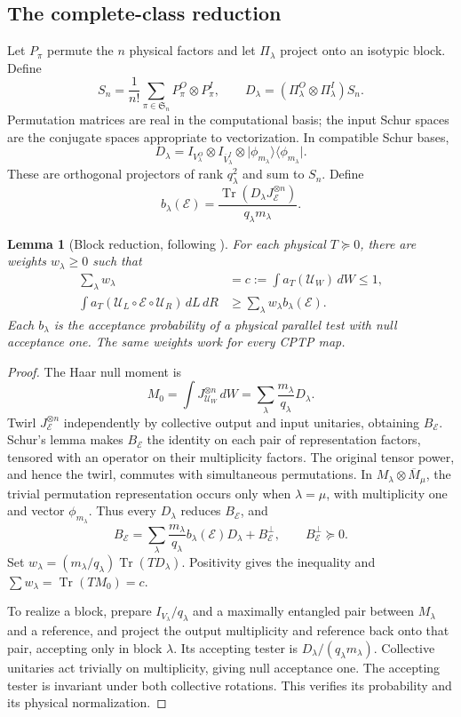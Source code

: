 \documentclass[11pt,a4paper]{article}
\newtheorem{lemma}[theorem]{Lemma}
\theoremstyle{remark}\newtheorem{remark}[theorem]{Remark}
\DeclareMathOperator{\Tr}{Tr}
\newcommand{\E}{\mathcal E}
\newcommand{\U}{\mathcal U}
\newcommand{\ket}[1]{\lvert #1\rangle}
\newcommand{\bra}[1]{\langle #1\rvert}
\begin{document}
\subsection{The complete-class reduction}
Let $P_\pi$ permute the $n$ physical factors and let $\Pi_\lambda$ project onto an isotypic block. Define
\[
S_n=\frac1{n!}\sum_{\pi\in\mathfrak S_n}P_\pi^O\otimes P_\pi^I,
\qquad D_\lambda=(\Pi_\lambda^O\otimes\Pi_\lambda^I)S_n.
\]
Permutation matrices are real in the computational basis; the input Schur spaces are the conjugate spaces appropriate to vectorization. In compatible Schur bases,
\[
D_\lambda=I_{V_\lambda^O}\otimes I_{\overline V_\lambda^I}
\otimes\ket{\phi_{m_\lambda}}\bra{\phi_{m_\lambda}}.
\]
These are orthogonal projectors of rank $q_\lambda^2$ and sum to $S_n$. Define
\[
b_\lambda(\E)=\frac{\Tr(D_\lambda J_\E^{\otimes n})}{q_\lambda m_\lambda}.
\]

\begin{lemma}[Block reduction, following \cite{complete}]\label{lem:block}
For each physical $T\succeq0$, there are weights $w_\lambda\ge0$ such that
\begin{align}
\sum_\lambda w_\lambda&=c:=\int a_T(\U_W)\,dW\le1,\\
\int a_T(\U_L\circ\E\circ\U_R)\,dL\,dR
&\ge\sum_\lambda w_\lambda b_\lambda(\E).
\end{align}
Each $b_\lambda$ is the acceptance probability of a physical parallel test with null acceptance one. The same weights work for every CPTP map.
\end{lemma}
\begin{proof}
The Haar null moment is
\[
M_0=\int J_{\U_W}^{\otimes n}\,dW
=\sum_\lambda\frac{m_\lambda}{q_\lambda}D_\lambda.
\]
Twirl $J_\E^{\otimes n}$ independently by collective output and input unitaries, obtaining $B_\E$. Schur's lemma makes $B_\E$ the identity on each pair of representation factors, tensored with an operator on their multiplicity factors. The original tensor power, and hence the twirl, commutes with simultaneous permutations. In $M_\lambda\otimes\overline M_\mu$, the trivial permutation representation occurs only when $\lambda=\mu$, with multiplicity one and vector $\phi_{m_\lambda}$. Thus every $D_\lambda$ reduces $B_\E$, and
\[
B_\E=\sum_\lambda\frac{m_\lambda}{q_\lambda}b_\lambda(\E)D_\lambda+B_\E^\perp,
\qquad B_\E^\perp\succeq0.
\]
Set $w_\lambda=(m_\lambda/q_\lambda)\Tr(TD_\lambda)$. Positivity gives the inequality and $\sum w_\lambda=\Tr(TM_0)=c$.

To realize a block, prepare $I_{V_\lambda}/q_\lambda$ and a maximally entangled pair between $M_\lambda$ and a reference, and project the output multiplicity and reference back onto that pair, accepting only in block $\lambda$. Its accepting tester is $D_\lambda/(q_\lambda m_\lambda)$. Collective unitaries act trivially on multiplicity, giving null acceptance one. The accepting tester is invariant under both collective rotations. This verifies its probability and its physical normalization.
\end{proof}
\end{document}
